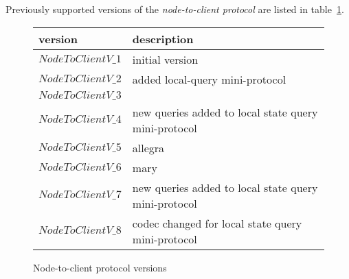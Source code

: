 \documentclass{report}
\begin{document}
Previously supported versions of the \textit{node-to-client protocol} are listed
in table~\ref{table:historical-node-to-client-protocol-versions}.
\begin{figure}[h]
  \begin{center}
    \begin{tabular}{l|l}
      version         & description \\\hline\hline
      $NodeToClientV\_1$ & initial version\\\hline
      $NodeToClientV\_2$ & added local-query mini-protocol\\\hline
      $NodeToClientV\_3$ & \\\hline
      $NodeToClientV\_4$ & new queries added to local state query mini-protocol\\\hline
      $NodeToClientV\_5$ & allegra \\\hline
      $NodeToClientV\_6$ & mary \\\hline
      $NodeToClientV\_7$ & new queries added to local state query mini-protocol\\\hline
      $NodeToClientV\_8$ & codec changed for local state query mini-protocol\\\hline
    \end{tabular}
    \caption{Node-to-client protocol versions}
    \label{table:historical-node-to-client-protocol-versions}
  \end{center}
\end{figure}



\end{document}

